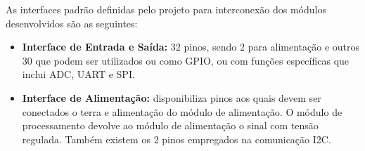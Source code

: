 
As interfaces padrão definidas pelo projeto \emote para interconexão dos
módulos desenvolvidos são as seguintes:
\begin{itemize}
    \item \textbf{Interface de Entrada e Saída:} 32 pinos, sendo 2 para
    alimentação e outros 30 que podem ser utilizados ou como GPIO, ou com
    funções específicas que inclui ADC, UART e SPI.
    \item \textbf{Interface de Alimentação:} disponibiliza pinos aos quais devem
    ser conectados o terra e alimentação do módulo de alimentação. O módulo de
    processamento devolve ao módulo de alimentação o sinal com tensão regulada.
    Também existem os 2 pinos empregados na comunicação I2C.
\end{itemize}
